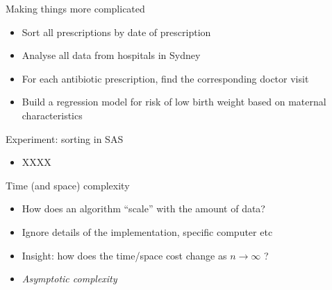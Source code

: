 \documentclass[aspectratio=169,12pt,usepdftitle=false]{beamer} %
\begin{document}
\begin{frame}{Making things more complicated}
    \begin{itemize}
	\item Sort all prescriptions by date of prescription
	\item Analyse all data from hospitals in Sydney
	\item For each antibiotic prescription, find the corresponding doctor visit
	\item Build a regression model for risk of low birth weight based on maternal characteristics
    \end{itemize}
\end{frame}

{
\begin{frame}[plain]
\end{frame}
}

\begin{frame}{Experiment: sorting in SAS}
    \begin{itemize}
	\item XXXX
    \end{itemize}
\end{frame}

\begin{frame}{Time (and space) complexity}
    \begin{itemize}
	\item How does an algorithm ``scale'' with the amount of data?
	\item Ignore details of the implementation, specific computer etc
	\item Insight: how does the time/space cost change as $n\rightarrow\infty$ ?
	\item \emph{Asymptotic complexity} %
    \end{itemize}
\end{frame}
\end{document}
